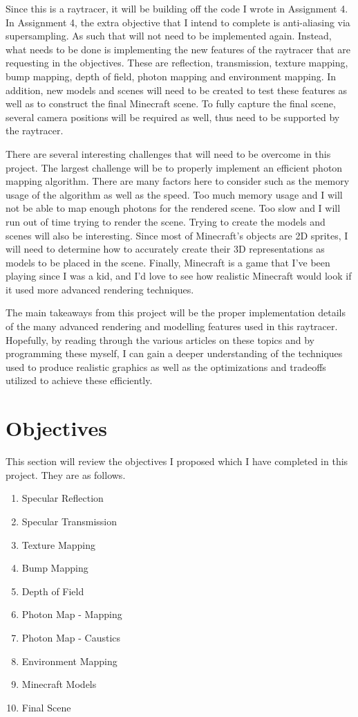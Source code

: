 \documentclass {article}
\begin{document}
\par
Since this is a raytracer, it will be building off the code I wrote
in Assignment 4. In Assignment 4, the extra objective that I intend to complete is anti-aliasing
via supersampling. As such that will not need to be implemented again. Instead, 
what needs to be done is implementing the new features of the raytracer that are requesting
in the objectives. These are reflection, transmission, texture mapping, bump mapping, depth
of field, photon mapping and environment mapping. In addition, 
new models and scenes will need
to be created to test these features as well as to construct the final Minecraft scene. To
fully capture the final scene, several camera positions will be required as well, thus
need to be supported by the raytracer.
\par
There are several interesting challenges that will need to be overcome in this project.
The largest challenge will be to properly implement an efficient photon mapping algorithm. 
There are many factors here to consider such as the memory usage of the algorithm
as well as the speed. Too much memory usage and I will not be able to map enough photons
for the rendered scene.
Too slow and I will run out of time trying to render the scene. Trying to 
create the models and scenes will also be interesting. Since most of Minecraft's
objects are 2D sprites, I will need to determine how to accurately create their 3D representations
as models to be placed in the scene. Finally,
Minecraft is a game that I've been playing since I was a kid, and I'd love to 
see how realistic Minecraft would look if it used more advanced rendering techniques.
\par
The main takeaways from this project will be the proper implementation details
of the many advanced rendering and modelling features used in this raytracer. Hopefully, by
reading through the various articles on these topics and by
programming these myself, I can gain a deeper understanding of the techniques
used to produce realistic graphics as well as the optimizations and tradeoffs
utilized to achieve these efficiently.
\section{Objectives}
This section will review the objectives I proposed which I have completed in this project. They are as follows.
\begin{enumerate}
    \item Specular Reflection
    \item Specular Transmission
    \item Texture Mapping
    \item Bump Mapping
    \item Depth of Field
    \item Photon Map - Mapping
    \item Photon Map - Caustics
    \item Environment Mapping
    \item Minecraft Models
    \item Final Scene
\end{enumerate}
\end{document}
